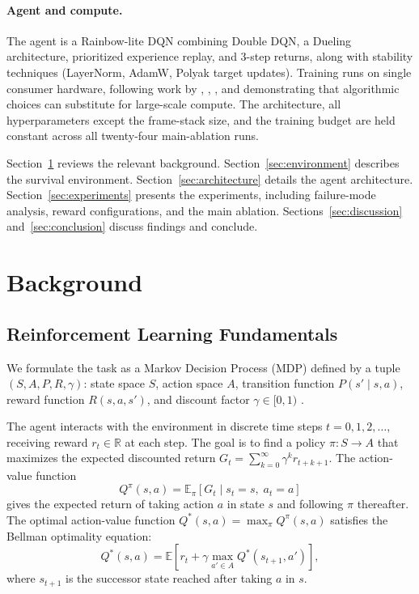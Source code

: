 \documentclass[12pt,a4paper,titlepage]{article}
\begin{document}
\paragraph{Agent and compute.} The agent is a Rainbow-lite DQN \citep{Hessel2018} combining Double DQN, a Dueling architecture, prioritized experience replay, and 3-step returns, along with stability techniques (LayerNorm, AdamW, Polyak target updates). Training runs on single consumer hardware, following work by \citet{ObandoCeron2021}, \citet{Schwarzer2023}, \citet{ObandoCeron2023}, and \citet{Clark2024} demonstrating that algorithmic choices can substitute for large-scale compute. The architecture, all hyperparameters except the frame-stack size, and the training budget are held constant across all twenty-four main-ablation runs.

Section~\ref{sec:background} reviews the relevant background. Section~\ref{sec:environment} describes the survival environment. Section~\ref{sec:architecture} details the agent architecture. Section~\ref{sec:experiments} presents the experiments, including failure-mode analysis, reward configurations, and the main ablation. Sections~\ref{sec:discussion} and~\ref{sec:conclusion} discuss findings and conclude.

\section{Background}
\label{sec:background}

\subsection{Reinforcement Learning Fundamentals}

We formulate the task as a Markov Decision Process (MDP) defined by a tuple $(S, A, P, R, \gamma)$: state space $S$, action space $A$, transition function $P(s' \mid s, a)$, reward function $R(s, a, s')$, and discount factor $\gamma \in [0, 1)$ \citep{SuttonBarto2018}.

The agent interacts with the environment in discrete time steps $t = 0, 1, 2, \ldots$, receiving reward $r_t \in \mathbb{R}$ at each step. The goal is to find a policy $\pi: S \to A$ that maximizes the expected discounted return $G_t = \sum_{k=0}^{\infty} \gamma^k r_{t+k+1}$. The action-value function
\begin{equation}
Q^\pi(s, a) = \mathbb{E}_\pi\!\left[G_t \mid s_t = s,\; a_t = a\right]
\end{equation}
gives the expected return of taking action $a$ in state $s$ and following $\pi$ thereafter. The optimal action-value function $Q^*(s, a) = \max_\pi Q^\pi(s, a)$ satisfies the Bellman optimality equation:
\begin{equation}
Q^*(s, a) = \mathbb{E}\!\left[r_t + \gamma \max_{a'\in A} Q^*(s_{t+1}, a')\right],
\end{equation}
where $s_{t+1}$ is the successor state reached after taking $a$ in $s$.
\end{document}
